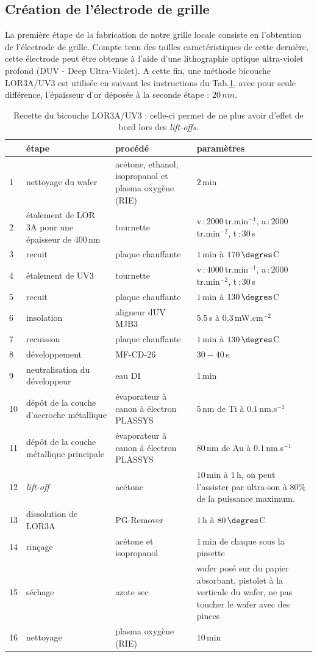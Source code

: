 \subsection{Création de l'électrode de grille}

La première étape de la fabrication de notre grille locale consiste en l'obtention de l'électrode de grille. Compte tenu des tailles caractéristiques de cette dernière, cette électrode peut \^etre obtenue à l'aide d'une lithographie optique ultra-violet profond (DUV - Deep Ultra-Violet). A cette fin, une méthode bicouche LOR3A/UV3 est utilisée en suivant les instructions du Tab.\ref{tab_recette}, avec pour seule différence, l'épaisseur d'or déposée à la seconde étape : $20\,nm$.

\begin{table}
\begin{center}
\begin{tabular}{|p{0.5cm}|p{4cm}|p{4cm}|p{3cm}|}
  \hline
\,& \textbf{étape} & \textbf{procédé} & \textbf{paramètres} \tabularnewline
\hline
1 &  nettoyage du wafer & acétone, ethanol, isopropanol et plasma oxygène (RIE)& $2\,$min \tabularnewline
\hline
 2 & étalement de LOR 3A pour une épaisseur de $400\,$nm& tournette & v\,:\,$2000\,$tr.min$^{-1}$, a\,:\,$2000\,$tr.min$^{-2}$, t\,:\,$30\,$s \tabularnewline
\hline
 3 & recuit & plaque chauffante & $1\,$min à $170\,\degres$C \tabularnewline
\hline
4 & étalement de UV3 & tournette & v\,:\,$4000\,$tr.min$^{-1}$, a\,:\,$2000\,$tr.min$^{-2}$, t\,:\,$30\,$s \tabularnewline
\hline
5 & recuit & plaque chauffante & $1\,$min à $130\,\degres$C \tabularnewline
\hline
6 & insolation & aligneur dUV MJB3 & $5.5\,$s à $0.3\,$mW.cm$^{-2}$\tabularnewline
\hline
7 & recuisson & plaque chauffante & $1\,$min à $130\,\degres$C \tabularnewline
\hline
8 & développement & MF-CD-26 & $30-40\,$s\tabularnewline
\hline
9 & neutralisation du développeur & eau DI & $1\,$min\tabularnewline
\hline
10 & dépôt de la couche d'accroche métallique & évaporateur à canon à électron PLASSYS & $5\,$nm de Ti à $0.1\,$nm.s$^{-1}$ \tabularnewline
\hline
11 & dépôt de la couche métallique principale & évaporateur à canon à électron PLASSYS & $80\,$nm de Au à $0.1\,$nm.s$^{-1}$ \tabularnewline
\hline
12 & \textit{lift-off} & acétone & $10\,$min à $1\,$h, on peut l'assister par ultra-son à $80\%$ de la puissance maximum. \tabularnewline
\hline
 13 & dissolution de LOR3A & PG-Remover & $1\,$h à $80\,\degres$C \tabularnewline
\hline
14 & rinçage & acétone et isopropanol & $1\,$min de chaque sous la pissette\tabularnewline
\hline
15 & séchage & azote sec & wafer posé sur du papier absorbant, pistolet à la verticale du wafer, ne pas toucher le wafer avec des pinces\tabularnewline
\hline
16 & nettoyage & plasma oxygène (RIE)& $10\,$min\tabularnewline
\hline
\end{tabular}
\caption{Recette du bicouche LOR3A/UV3 : celle-ci permet de ne plus avoir d'effet de bord lors des \textit{lift-offs}.}
\label{tab_recette}
\end{center}
\end{table}


